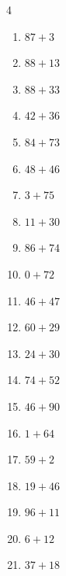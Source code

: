 \begin{multicols}{4}
\begin{enumerate}
  \item $87+3$
        \phantom{$=90$}

  \item $88+13$
        \phantom{$=101$}

  \item $88+33$
        \phantom{$=121$}

  \item $42+36$
        \phantom{$=78$}

  \item $84+73$
        \phantom{$=157$}

  \item $48+46$
        \phantom{$=94$}

  \item $3+75$
        \phantom{$=78$}

  \item $11+30$
        \phantom{$=41$}

  \item $86+74$
        \phantom{$=160$}

  \item $0+72$
        \phantom{$=72$}

  \item $46+47$
        \phantom{$=93$}

\columnbreak %

  \item $60+29$
        \phantom{$=89$}

  \item $24+30$
        \phantom{$=54$}

  \item $74+52$
        \phantom{$=126$}

  \item $46+90$
        \phantom{$=136$}

  \item $1+64$
        \phantom{$=65$}

  \item $59+2$
        \phantom{$=61$}

  \item $19+46$
        \phantom{$=65$}

  \item $96+11$
        \phantom{$=107$}

  \item $6+12$
        \phantom{$=18$}

  \item $37+18$
        \phantom{$=55$}


\end{enumerate}
\end{multicols}
